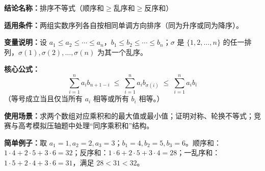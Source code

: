 \textbf{结论名称：}排序不等式（顺序和$\geq$乱序和$\geq$反序和）

\textbf{适用条件：}两组实数序列各自按相同单调方向排序（同为升序或同为降序）。

\textbf{变量说明：}设 $a_1\leq a_2\leq\cdots\leq a_n$，$b_1\leq b_2\leq\cdots\leq b_n$；$\sigma$ 是 $\{1,2,\dots,n\}$ 的任一排列，$\sigma(1),\sigma(2),\dots,\sigma(n)$ 为其一个乱序。

\textbf{核心公式：}
\[
\boxed{\sum_{i=1}^{n} a_i b_{n+1-i}\;\leq\;\sum_{i=1}^{n} a_i b_{\sigma(i)}\;\leq\;\sum_{i=1}^{n} a_i b_i}
\]
（等号成立当且仅当所有 $a_i$ 相等或所有 $b_i$ 相等。）

\textbf{使用场景：}求两个数组对应乘积和的最大值或最小值；证明对称、轮换不等式；竞赛与高考模拟压轴题中处理“同序乘积和”结构。

\textbf{简单例子：}取 $a_1=1,a_2=2,a_3=3$；$b_1=4,b_2=5,b_3=6$。顺序和：$1\cdot4+2\cdot5+3\cdot6=32$；反序和：$1\cdot6+2\cdot5+3\cdot4=28$；一乱序和：$1\cdot5+2\cdot4+3\cdot6=31$，满足 $28<31<32$。